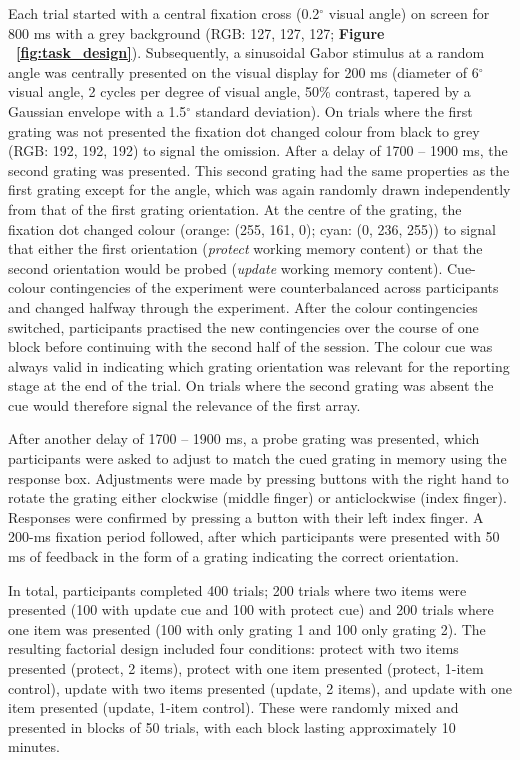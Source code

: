 \documentclass{article}
\begin{document}
Each trial started with a central fixation cross (0.2$^{\circ}$ visual angle) on screen for 800 ms with a grey background (RGB: 127, 127, 127; \textbf{Figure ~\ref{fig:task_design}}). Subsequently, a sinusoidal Gabor stimulus at a random angle was centrally presented on the visual display for 200 ms (diameter of 6$^{\circ}$ visual angle, 2 cycles per degree of visual angle, 50\% contrast, tapered by a Gaussian envelope with a 1.5$^{\circ}$ standard deviation). On trials where the first grating was not presented the fixation dot changed colour from black to grey (RGB: 192, 192, 192) to signal the omission. After a delay of 1700 – 1900 ms, the second grating was presented. This second grating had the same properties as the first grating except for the angle, which was again randomly drawn independently from that of the first grating orientation. At the centre of the grating, the fixation dot changed colour (orange: (255, 161, 0); cyan: (0, 236, 255)) to signal that either the first orientation (\textit{protect} working memory content) or that the second orientation would be probed (\textit{update} working memory content). Cue-colour contingencies of the experiment were counterbalanced across participants and changed halfway through the experiment. After the colour contingencies switched, participants practised the new contingencies over the course of one block before continuing with the second half of the session. The colour cue was always valid in indicating which grating orientation was relevant for the reporting stage at the end of the trial. On trials where the second grating was absent the cue would therefore signal the relevance of the first array. 

After another delay of 1700 – 1900 ms, a probe grating was presented, which participants were asked to adjust to match the cued grating in memory using the response box. Adjustments were made by pressing buttons with the right hand to rotate the grating either clockwise (middle finger) or anticlockwise (index finger). Responses were confirmed by pressing a button with their left index finger. A 200-ms fixation period followed, after which participants were presented with 50 ms of feedback in the form of a grating indicating the correct orientation.

In total, participants completed 400 trials; 200 trials where two items were presented (100 with update cue and 100 with protect cue) and 200 trials where one item was presented (100 with only grating 1 and 100 only grating 2). The resulting factorial design included four conditions: protect with two items presented (protect, 2 items), protect with one item presented (protect, 1-item control), update with two items presented (update, 2 items), and update with one item presented (update, 1-item control). These were randomly mixed and presented in blocks of 50 trials, with each block lasting approximately 10 minutes.\\
\end{document}
